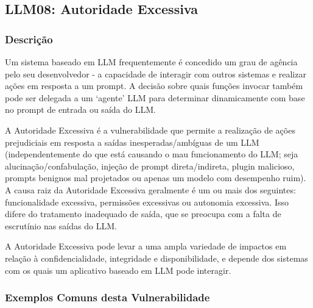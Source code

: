 \documentclass[
]{article}
\author{}
\date{}
\begin{document}
\subsection{LLM08: Autoridade
Excessiva}\label{llm08-autoridade-excessiva}

\subsubsection{Descrição}\label{descriuxe7uxe3o}

Um sistema baseado em LLM frequentemente é concedido um grau de agência
pelo seu desenvolvedor - a capacidade de interagir com outros sistemas e
realizar ações em resposta a um prompt. A decisão sobre quais funções
invocar também pode ser delegada a um `agente' LLM para determinar
dinamicamente com base no prompt de entrada ou saída do LLM.

A Autoridade Excessiva é a vulnerabilidade que permite a realização de
ações prejudiciais em resposta a saídas inesperadas/ambíguas de um LLM
(independentemente do que está causando o mau funcionamento do LLM; seja
alucinação/confabulação, injeção de prompt direta/indireta, plugin
malicioso, prompts benignos mal projetados ou apenas um modelo com
desempenho ruim). A causa raiz da Autoridade Excessiva geralmente é um
ou mais dos seguintes: funcionalidade excessiva, permissões excessivas
ou autonomia excessiva. Isso difere do tratamento inadequado de saída,
que se preocupa com a falta de escrutínio nas saídas do LLM.

A Autoridade Excessiva pode levar a uma ampla variedade de impactos em
relação à confidencialidade, integridade e disponibilidade, e depende
dos sistemas com os quais um aplicativo baseado em LLM pode interagir.

\subsubsection{Exemplos Comuns desta
Vulnerabilidade}\label{exemplos-comuns-desta-vulnerabilidade}
\end{document}
